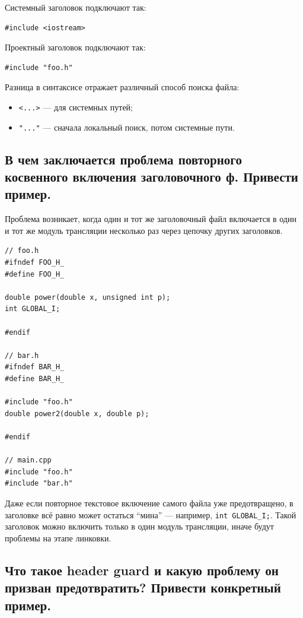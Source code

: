 Системный заголовок подключают так:
\begin{verbatim}
#include <iostream>
\end{verbatim}

Проектный заголовок подключают так:
\begin{verbatim}
#include "foo.h"
\end{verbatim}

Разница в синтаксисе отражает различный способ поиска файла:
\begin{itemize}
    \item \texttt{<...>} --- для системных путей;
    \item \texttt{"..."} --- сначала локальный поиск, потом системные пути.
\end{itemize}


\subsection{В чем заключается проблема повторного косвенного включения заголовочного ф. Привести пример.}

Проблема возникает, когда один и тот же заголовочный файл включается в один и тот же модуль трансляции несколько раз через цепочку других заголовков.

\begin{example}
\begin{verbatim}
// foo.h
#ifndef FOO_H_
#define FOO_H_

double power(double x, unsigned int p);
int GLOBAL_I;

#endif

// bar.h
#ifndef BAR_H_
#define BAR_H_

#include "foo.h"
double power2(double x, double p);

#endif

// main.cpp
#include "foo.h"
#include "bar.h"
\end{verbatim}
\end{example}

Даже если повторное текстовое включение самого файла уже предотвращено, в заголовке всё равно может остаться ``мина'' --- например, \texttt{int GLOBAL\_I;}. Такой заголовок можно включить только в один модуль трансляции, иначе будут проблемы на этапе линковки.


\subsection{Что такое header guard и какую проблему он призван предотвратить? Привести конкретный пример.}

